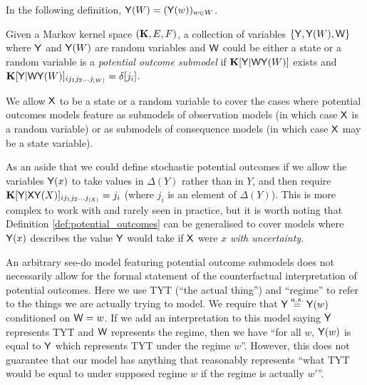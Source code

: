 In the following definition, $\mathsf{Y}(W)=(\mathsf{Y}(w))_{w\in W}$.

\begin{definition}\label{def:potential_outcomes}
Given a Markov kernel space $(\mathbf{K},E,F)$, a collection of variables $\{\mathsf{Y}, \mathsf{Y}(W), \mathsf{W}\}$ where $\mathsf{Y}$ and $\mathsf{Y}(W)$ are random variables and $\mathsf{W}$ could be either a state or a random variable is a \emph{potential outcome submodel} if $\mathbf{K}[\mathsf{Y}|\mathsf{W}\mathsf{Y}(W)]$ exists and $\mathbf{K}[\mathsf{Y}|\mathsf{W}\mathsf{Y}(W)]_{i j_1 j_2 ... j_{|W|}} = \delta[j_i]$. 
\end{definition}


We allow $\mathsf{X}$ to be a state or a random variable to cover the cases where potential outcomes models feature as submodels of observation models (in which case $\mathsf{X}$ is a random variable) or as submodels of consequence models (in which case $\mathsf{X}$ may be a state variable).

As an aside that we could define stochastic potential outcomes if we allow the variables $\mathsf{Y}(x)$ to take values in $\Delta(Y)$ rather than in $Y$, and then require $\mathbf{K}[\mathsf{Y}|\mathsf{X}\mathsf{Y}(X)]_{i j_1 j_2 ... j_{|X|}} = j_i$ (where $j_i$ is an element of $\Delta(Y)$). This is more complex to work with and rarely seen in practice, but it is worth noting that Definition \ref{def:potential_outcomes} can be generalised to cover models where $\mathsf{Y}(x)$ describes the value $\mathsf{Y}$ would take if $\mathsf{X}$ were $x$ \emph{with uncertainty}.

An arbitrary see-do model featuring potential outcome submodels does not necessarily allow for the formal statement of the counterfactual interpretation of potential outcomes. Here we use TYT (``the actual thing'') and ``regime'' to refer to the things we are actually trying to model. We require that $\mathsf{Y}\overset{a.s.}{=}\mathsf{Y}(w)$ conditioned on $\mathsf{W}=w$. If we add an interpretation to this model saying $\mathsf{Y}$ represents TYT and $\mathsf{W}$ represents the regime, then we have ``for all $w$, $\mathsf{Y}(w)$ is equal to $\mathsf{Y}$ which represents TYT under the regime $w$''. However, this does not guarantee that our model has anything that reasonably represents ``what TYT would be equal to under supposed regime $w$ if the regime is actually $w'$''.

